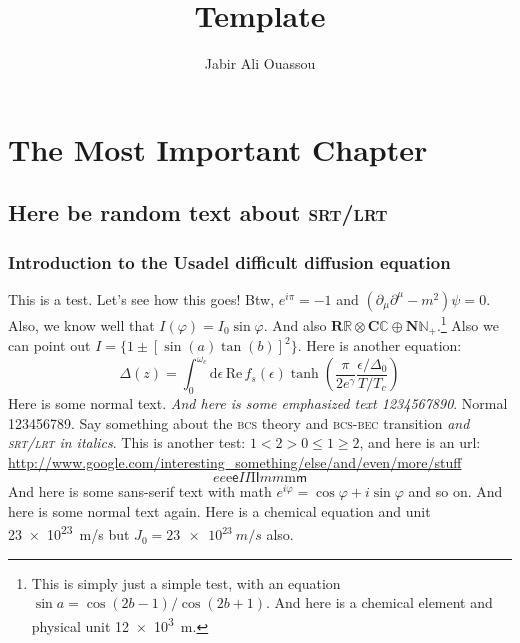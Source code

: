 \documentclass[b5paper,twoside,openright]{scrbook}
\title{Template}
\author{Jabir Ali Ouassou}
\begin{document}
\maketitle %
\frontmatter
\tableofcontents
\mainmatter 


\chapter{The Most Important Chapter}
\section{Here be random text about \textsc{srt/lrt}}
\subsection{Introduction to the Usadel difficult diffusion equation}
This is a test. Let's see how this goes! Btw, $e^{i\pi} = -1$ and $(\partial_\mu \partial^\mu - m^2) \psi = 0$.
Also, we know well that $I(\varphi) = I_0 \sin \varphi$.  And also $\mathbf{R}\mathbb{R} \otimes \mathbf{C}\mathbb{C} \oplus \mathbf{N}\mathbb{N}_+$.\footnote{This is simply just a simple test, with an equation $\sin a = \cos(2b-1)/\cos(2b+1)$. And here is a chemical element  and physical unit \SI{12e3}{m}.}
Also we can point out $I = \{ 1 \pm [\sin(a)\tan(b)]^2\} $.
Here is another equation:
\begin{equation}
  \Delta(z) = \int_0^{\omega_c} \mathrm{d}\epsilon\,\mathrm{Re}\, f_s(\epsilon) \tanh\!\left(\frac{\pi}{2e^\gamma} \frac{\epsilon/\Delta_0}{T/T_c}\right)
\end{equation}
Here is some normal text. \textit{And here is some emphasized text 1234567890}. Normal 123456789. 
Say something about the \textsc{bcs} theory and \textsc{bcs-bec} transition \emph{and \textsc{srt/lrt} in italics}.
This is another test: $1 < 2 > 0 \leq 1 \geq 2$, and here is an url: \url{http://www.google.com/interesting_something/else/and/even/more/stuff}
\begin{equation}
  \textit{e}e\mathrm{e}\textsf{e}%
  \textit{I}I\mathrm{I}\textsf{I}%
  \textit{m}m\mathrm{m}\textsf{m}%
\end{equation}
\textsf{And here is some sans-serif text with math $e^{i\varphi}=\cos\varphi+i\sin\varphi$ and so on.} And here is some normal text again.
Here is a chemical equation  and unit \SI{23e23}{m/s} but $J_0 = \SI{23e23}{m/s}$ also.
\end{document}
